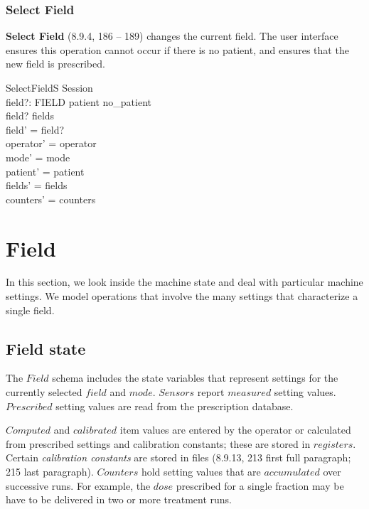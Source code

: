 \subsubsection{Select Field}

{\bf Select Field} (8.9.4, 186 -- 189) changes the current field.
The user interface ensures this operation cannot occur if there is no
patient, and ensures that the new field is prescribed.

\begin{schema}{SelectFieldS}
	\Delta Session \\
	field?: FIELD
\where
	patient \neq no\_patient \\
	field? \in \dom fields \\
	field' = field? \\
\also
	operator' = operator \\
	mode' = mode \\
	patient' = patient \\
	fields' = fields \\
	counters' = counters
\end{schema}

\section{Field} \label{sect:field}

In this section, we look inside the machine state and deal
with particular machine settings.  We model operations that involve
the many settings that characterize a single field.

\subsection{Field state}

The $Field$ schema includes the state variables that represent
settings for the currently selected $field$ and $mode$.  $Sensors$
report $measured$ setting values.  $Prescribed$ setting values are
read from the prescription database.

$Computed$ and $calibrated$ item values are entered by the operator or
calculated from prescribed settings and calibration constants; these
are stored in $registers$.  Certain {\em calibration constants} are
stored in files (8.9.13, 213 first full paragraph; 215 last
paragraph).  $Counters$ hold setting values that are $accumulated$
over successive runs.  For example, the $dose$ prescribed for a single
fraction may be have to be delivered in two or more treatment runs.

